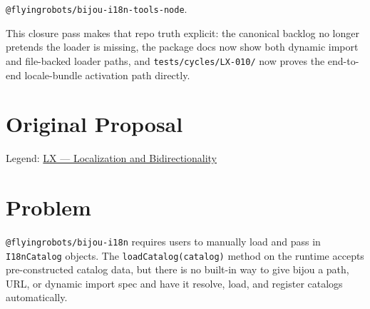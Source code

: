 \texttt{@\allowbreak{}f\allowbreak{}l\allowbreak{}y\allowbreak{}i\allowbreak{}n\allowbreak{}g\allowbreak{}r\allowbreak{}o\allowbreak{}b\allowbreak{}o\allowbreak{}t\allowbreak{}s\allowbreak{}/\allowbreak{}b\allowbreak{}i\allowbreak{}j\allowbreak{}o\allowbreak{}u\allowbreak{}-\allowbreak{}i\allowbreak{}1\allowbreak{}8\allowbreak{}n\allowbreak{}-\allowbreak{}t\allowbreak{}o\allowbreak{}o\allowbreak{}l\allowbreak{}s\allowbreak{}-\allowbreak{}n\allowbreak{}o\allowbreak{}d\allowbreak{}e}.

This closure pass makes that repo truth explicit: the canonical backlog no longer pretends the loader is missing, the package docs now show both dynamic import and file-backed loader paths, and \texttt{t\allowbreak{}e\allowbreak{}s\allowbreak{}t\allowbreak{}s\allowbreak{}/\allowbreak{}c\allowbreak{}y\allowbreak{}c\allowbreak{}l\allowbreak{}e\allowbreak{}s\allowbreak{}/\allowbreak{}L\allowbreak{}X\allowbreak{}-\allowbreak{}0\allowbreak{}1\allowbreak{}0\allowbreak{}/} now proves the end-to-end locale-bundle activation path directly.

\section{Original Proposal}\label{record-358-original-proposal}

Legend: \href{https://github.com/flyingrobots/bijou/blob/1853ad902f6bf219326409e7f743a5a1d6517dbc/docs/method/legends/LX-localization-and-bidirectionality.md}{LX --- Localization and Bidirectionality}

\section{Problem}\label{record-358-problem}

\texttt{@\allowbreak{}f\allowbreak{}l\allowbreak{}y\allowbreak{}i\allowbreak{}n\allowbreak{}g\allowbreak{}r\allowbreak{}o\allowbreak{}b\allowbreak{}o\allowbreak{}t\allowbreak{}s\allowbreak{}/\allowbreak{}b\allowbreak{}i\allowbreak{}j\allowbreak{}o\allowbreak{}u\allowbreak{}-\allowbreak{}i\allowbreak{}1\allowbreak{}8\allowbreak{}n} requires users to manually load and pass in \texttt{I\allowbreak{}1\allowbreak{}8\allowbreak{}n\allowbreak{}C\allowbreak{}a\allowbreak{}t\allowbreak{}a\allowbreak{}l\allowbreak{}o\allowbreak{}g} objects. The \texttt{l\allowbreak{}o\allowbreak{}a\allowbreak{}d\allowbreak{}C\allowbreak{}a\allowbreak{}t\allowbreak{}a\allowbreak{}l\allowbreak{}o\allowbreak{}g\allowbreak{}(\allowbreak{}c\allowbreak{}a\allowbreak{}t\allowbreak{}a\allowbreak{}l\allowbreak{}o\allowbreak{}g\allowbreak{})} method on the runtime accepts pre-constructed catalog data, but there is no built-in way to give bijou a path, URL, or dynamic import spec and have it resolve, load, and register catalogs automatically.

